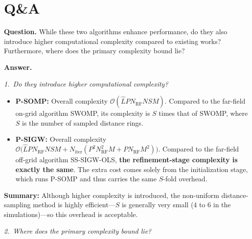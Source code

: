 \documentclass[12pt,a4paper]{article}
\begin{document}
\bigskip

\section*{Q\&A}

\noindent\textbf{Question.}\enspace
While these two algorithms enhance performance, do they also introduce
higher computational complexity compared to existing works?
Furthermore, where does the primary complexity bound lie?

\vspace{0.9em}
\noindent\textbf{Answer.}

\vspace{0.4em}
\noindent\textit{1.~Do they introduce higher computational complexity?}

\begin{itemize}
  \item \textbf{P-SOMP:} Overall complexity
    $\mathcal{O}(\hat{L}PN_{\mathrm{RF}}NSM)$.
    Compared to the far-field on-grid algorithm SWOMP, its complexity is
    $S$ times that of SWOMP, where $S$ is the number of sampled distance
    rings.

  \item \textbf{P-SIGW:} Overall complexity
    $\mathcal{O}\!\bigl(\hat{L}PN_{\mathrm{RF}}NSM
      +N_{\mathrm{iter}}(P^{2}N_{\mathrm{RF}}^{2}M
        +PN_{\mathrm{RF}}M^{2})\bigr)$.
    Compared to the far-field off-grid algorithm SS-SIGW-OLS,
    \textbf{the refinement-stage complexity is exactly the same}.
    The extra cost comes solely from the initialization stage, which runs
    P-SOMP and thus carries the same $S$-fold overhead.
\end{itemize}

\noindent
\textbf{Summary:} Although higher complexity is introduced, the
non-uniform distance-sampling method is highly efficient---$S$ is
generally very small (4 to 6 in the simulations)---so this overhead is
acceptable.

\vspace{0.9em}
\noindent\textit{2.~Where does the primary complexity bound lie?}
\end{document}
